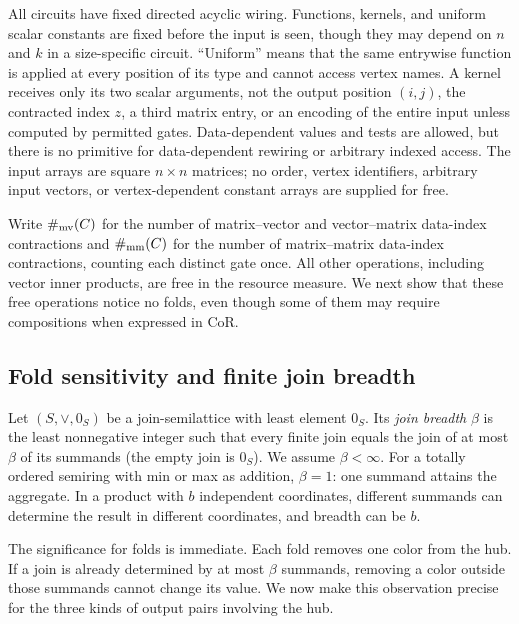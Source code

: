 All circuits have fixed directed acyclic wiring. Functions, kernels,
and uniform scalar constants are fixed before the input is seen,
though they may depend on $n$ and $k$ in a size-specific circuit.
``Uniform'' means that the same entrywise function is applied at
every position of its type and cannot access vertex names.
A kernel receives only its two scalar arguments, not the output
position $(i,j)$, the contracted index $z$, a third matrix entry,
or an encoding of the entire input unless computed by permitted
gates. Data-dependent values and tests are allowed, but there is
no primitive for data-dependent rewiring or arbitrary indexed
access. The input arrays are square $n\times n$ matrices; no order,
vertex identifiers, arbitrary input vectors, or vertex-dependent
constant arrays are supplied for free.

Write $\#_{\mathrm{mv}}(C)$ for the number of matrix--vector and
vector--matrix data-index contractions and $\#_{\mathrm{mm}}(C)$ for the
number of matrix--matrix data-index contractions, counting each
distinct gate once. All other operations, including vector inner
products, are free in the resource measure. We next show that these
free operations notice no folds, even though some of them may
require compositions when expressed in CoR.

\subsection{Fold sensitivity and finite join breadth}\label{sec:breadth}
Let $(S,\vee,0_S)$ be a join-semilattice with least element $0_S$.
Its \emph{join breadth} $\beta$ is the least nonnegative integer such
that every finite join equals the join of at most $\beta$ of its
summands (the empty join is $0_S$). We assume $\beta<\infty$.
For a totally ordered semiring with min or max as addition,
$\beta=1$: one summand attains the aggregate. In a product with
$b$ independent coordinates, different summands can determine
the result in different coordinates, and breadth can be $b$.

The significance for folds is immediate. Each fold removes one
color from the hub. If a join is already determined by at most
$\beta$ summands, removing a color outside those summands
cannot change its value. We now make this observation precise
for the three kinds of output pairs involving the hub.

